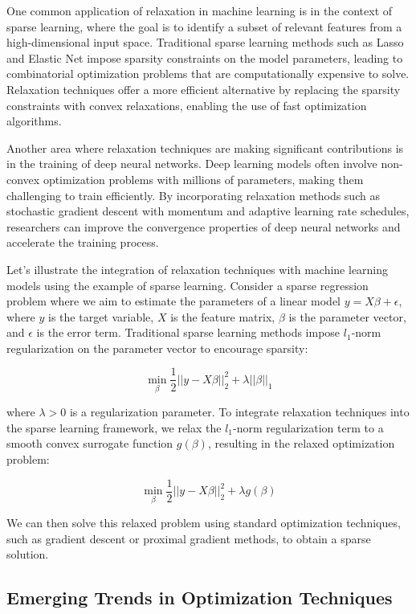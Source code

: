 \documentclass[12pt]{book} %
\begin{document}
One common application of relaxation in machine learning is in the context of sparse learning, where the goal is to identify a subset of relevant features from a high-dimensional input space. Traditional sparse learning methods such as Lasso and Elastic Net impose sparsity constraints on the model parameters, leading to combinatorial optimization problems that are computationally expensive to solve. Relaxation techniques offer a more efficient alternative by replacing the sparsity constraints with convex relaxations, enabling the use of fast optimization algorithms.

Another area where relaxation techniques are making significant contributions is in the training of deep neural networks. Deep learning models often involve non-convex optimization problems with millions of parameters, making them challenging to train efficiently. By incorporating relaxation methods such as stochastic gradient descent with momentum and adaptive learning rate schedules, researchers can improve the convergence properties of deep neural networks and accelerate the training process.

Let's illustrate the integration of relaxation techniques with machine learning models using the example of sparse learning. Consider a sparse regression problem where we aim to estimate the parameters of a linear model \(y = X\beta + \epsilon\), where \(y\) is the target variable, \(X\) is the feature matrix, \(\beta\) is the parameter vector, and \(\epsilon\) is the error term. Traditional sparse learning methods impose \(l_1\)-norm regularization on the parameter vector to encourage sparsity:

\[
\min_{\beta} \frac{1}{2} ||y - X\beta||_2^2 + \lambda ||\beta||_1
\]

where \(\lambda > 0\) is a regularization parameter. To integrate relaxation techniques into the sparse learning framework, we relax the \(l_1\)-norm regularization term to a smooth convex surrogate function \(g(\beta)\), resulting in the relaxed optimization problem:

\[
\min_{\beta} \frac{1}{2} ||y - X\beta||_2^2 + \lambda g(\beta)
\]

We can then solve this relaxed problem using standard optimization techniques, such as gradient descent or proximal gradient methods, to obtain a sparse solution.

\subsection{Emerging Trends in Optimization Techniques}
\end{document}
